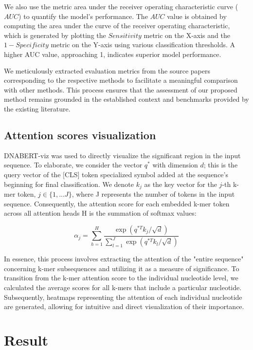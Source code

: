 \documentclass[a4paper,fleqn]{cas-dc}
\begin{document}
We also use the metric area under the receiver operating characteristic curve ($AUC$) to quantify the model's performance. The $AUC$ value is obtained by computing the area under the curve of the receiver operating characteristic, which is generated by plotting the $Sensitivity$ metric on the X-axis and the $1 - Specificity$ metric on the Y-axis using various classification thresholds. A higher AUC value, approaching 1, indicates superior model performance.

We meticulously extracted evaluation metrics from the source papers corresponding to the respective methods to facilitate a meaningful comparison with other methods. This process ensures that the assessment of our proposed method remains grounded in the established context and benchmarks provided by the existing literature.

\subsection{Attention scores visualization}

DNABERT-viz\cite{Ji2021} was used to directly visualize the significant region in the input sequence. To elaborate, we consider the vector $q^*$ with dimension $d$; this is the query vector of the [CLS] token specialized symbol added at the sequence's beginning for final classification. We denote $k_j$ as the key vector for the $j$-th k-mer token, $j \in \{1,...J\}$, where J represents the number of tokens in the input sequence. Consequently, the attention score for each embedded k-mer token across all attention heads H is the summation of softmax values: 

$$ \alpha_j=\sum_{h=1}^{H}\frac{\exp(q^{\ast T}k_j/\sqrt d)}{\sum_{l=1}^{J}{\exp(q^{\ast T}k_l/\sqrt d)}} $$

In essence, this process involves extracting the attention of the "entire sequence" concerning k-mer subsequences and utilizing it as a measure of significance. To transition from the k-mer attention score to the individual nucleotide level, we calculated the average scores for all k-mers that include a particular nucleotide. Subsequently, heatmaps representing the attention of each individual nucleotide are generated, allowing for intuitive and direct visualization of their importance.
\section{Result}
\end{document}
